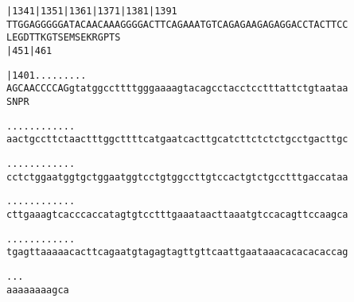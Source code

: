 \documentclass{article}
\begin{document}
\begin{alltt}
  |1341     |1351     |1361     |1371     |1381     |1391   
TTGGAGGGGGATACAACAAAGGGGACTTCAGAAATGTCAGAGAAGAGAGGACCTACTTCC
L  E  G  D  T  T  K  G  T  S  E  M  S  E  K  R  G  P  T  S  
            |451                          |461              

  |1401        .    .    .    .    .    .    .    .    .    
AGCAACCCCAGgtatggccttttgggaaaagtacagcctacctcctttattctgtaataa
S  N  P  R                                                  

.    .    .    .    .    .    .    .    .    .    .    .    
aactgccttctaactttggcttttcatgaatcacttgcatcttctctctgcctgacttgc

.    .    .    .    .    .    .    .    .    .    .    .    
cctctggaatggtgctggaatggtcctgtggccttgtccactgtctgcctttgaccataa

.    .    .    .    .    .    .    .    .    .    .    .    
cttgaaagtcacccaccatagtgtcctttgaaataacttaaatgtccacagttccaagca

.    .    .    .    .    .    .    .    .    .    .    .    
tgagttaaaaacacttcagaatgtagagtagttgttcaattgaataaacacacacaccag

.    .    .
aaaaaaaagca
\end{alltt}
\newpage
\end{document}
